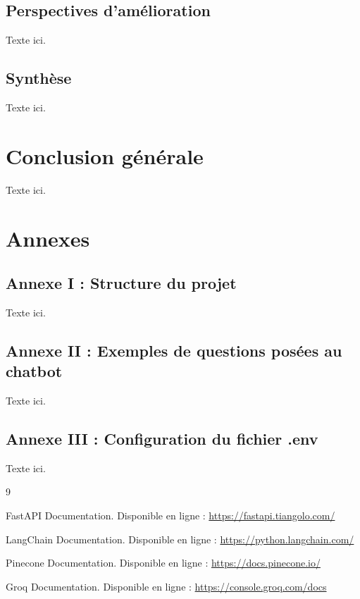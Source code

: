 \documentclass[12pt,a4paper]{report}
\begin{document}
\section{Perspectives d'amélioration}
Texte ici.

\section{Synthèse}
Texte ici.

\chapter*{Conclusion générale}
Texte ici.

\chapter*{Annexes}

\section*{Annexe I : Structure du projet}
Texte ici.

\section*{Annexe II : Exemples de questions posées au chatbot}
Texte ici.

\section*{Annexe III : Configuration du fichier .env}
Texte ici.

\begin{thebibliography}{9}

FastAPI Documentation. Disponible en ligne : \url{https://fastapi.tiangolo.com/}

LangChain Documentation. Disponible en ligne : \url{https://python.langchain.com/}

Pinecone Documentation. Disponible en ligne : \url{https://docs.pinecone.io/}

Groq Documentation. Disponible en ligne : \url{https://console.groq.com/docs}

\end{thebibliography}
\end{document}
